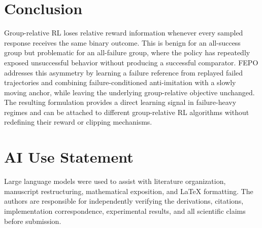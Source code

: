 \documentclass{article}
\newcommand{\FEPO}{\textsc{FEPO}\xspace}
\begin{document}
\section{Conclusion}
Group-relative RL loses relative reward information whenever every sampled response receives the same binary outcome. This is benign for an all-success group but problematic for an all-failure group, where the policy has repeatedly exposed unsuccessful behavior without producing a successful comparator. \FEPO addresses this asymmetry by learning a failure reference from replayed failed trajectories and combining failure-conditioned anti-imitation with a slowly moving anchor, while leaving the underlying group-relative objective unchanged. The resulting formulation provides a direct learning signal in failure-heavy regimes and can be attached to different group-relative RL algorithms without redefining their reward or clipping mechanisms.

\section*{AI Use Statement}
Large language models were used to assist with literature organization, manuscript restructuring, mathematical exposition, and LaTeX formatting. The authors are responsible for independently verifying the derivations, citations, implementation correspondence, experimental results, and all scientific claims before submission.
\end{document}
